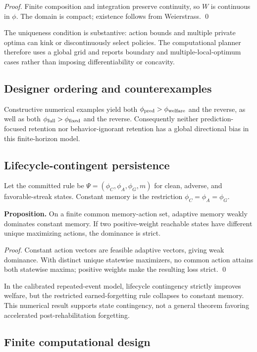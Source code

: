 \textit{Proof.} Finite composition and integration preserve continuity, so $W$ is continuous in $\phi$. The domain is compact; existence follows from Weierstrass. \qed

The uniqueness condition is substantive: action bounds and multiple private optima can kink or discontinuously select policies. The computational planner therefore uses a global grid and reports boundary and multiple-local-optimum cases rather than imposing differentiability or concavity.

\subsection{Designer ordering and counterexamples}

Constructive numerical examples yield both $\phi_{\rm pred}>\phi_{\rm welfare}$ and the reverse, as well as both $\phi_{\rm full}>\phi_{\rm fixed}$ and the reverse. Consequently neither prediction-focused retention nor behavior-ignorant retention has a global directional bias in this finite-horizon model.

\subsection{Lifecycle-contingent persistence}

Let the committed rule be $\Psi=(\phi_C,\phi_A,\phi_G,m)$ for clean, adverse, and favorable-streak states. Constant memory is the restriction $\phi_C=\phi_A=\phi_G$.

\textbf{Proposition.} On a finite common memory-action set, adaptive memory weakly dominates constant memory. If two positive-weight reachable states have different unique maximizing actions, the dominance is strict.

\textit{Proof.} Constant action vectors are feasible adaptive vectors, giving weak dominance. With distinct unique statewise maximizers, no common action attains both statewise maxima; positive weights make the resulting loss strict. \qed

In the calibrated repeated-event model, lifecycle contingency strictly improves welfare, but the restricted earned-forgetting rule collapses to constant memory. This numerical result supports state contingency, not a general theorem favoring accelerated post-rehabilitation forgetting.

\subsection{Finite computational design}

